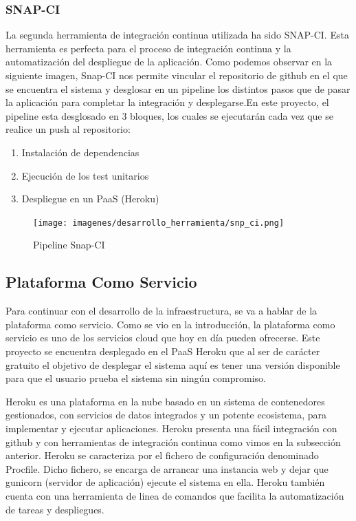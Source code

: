 \documentclass[a4paper,11pt]{book}
\begin{document}
\subsubsection{SNAP-CI}
La segunda herramienta de integración continua utilizada ha sido SNAP-CI\cite{snap}. Esta herramienta es perfecta para el proceso de integración continua y la automatización del despliegue de la aplicación. Como podemos observar en la siguiente imagen, Snap-CI nos permite vincular el repositorio de github en el que se encuentra el sistema y desglosar en un pipeline los distintos pasos que de pasar la aplicación para completar la integración y desplegarse.En este proyecto, el pipeline esta desglosado en 3 bloques, los cuales se ejecutarán cada vez que se realice un push al repositorio:

\begin{enumerate}
\item Instalación de dependencias
\item Ejecución de los test unitarios
\item Despliegue en un PaaS (Heroku)  
\end{enumerate}

\begin{figure}[H] 
\centering 
\texttt{[image: imagenes/desarrollo\_herramienta/snp\_ci.png]}
\caption{ Pipeline Snap-CI\cite{snapP}  }  
\end{figure}  	





\subsection{Plataforma Como Servicio}

Para continuar con el desarrollo de la infraestructura, se va a hablar de la plataforma como servicio. Como se vio en la introducción, la plataforma como servicio es uno de los servicios cloud que hoy en día pueden ofrecerse. Este proyecto se encuentra desplegado en el PaaS Heroku\cite{hero} que al ser de carácter gratuito el objetivo de desplegar el sistema aquí es tener una versión disponible para que el usuario prueba el sistema sin ningún compromiso.
 	
 

Heroku es una plataforma en la nube basado en un sistema de contenedores gestionados, con servicios de datos integrados y un potente ecosistema, para implementar y ejecutar aplicaciones. Heroku presenta una fácil integración con github y con herramientas de integración continua como vimos en la subsección anterior. Heroku se caracteriza por el fichero de configuración denominado Procfile. Dicho fichero, se encarga de arrancar una instancia web y dejar que gunicorn (servidor de aplicación) ejecute el sistema en ella. Heroku también cuenta con una herramienta de linea de comandos que facilita la automatización de tareas y despliegues. 
\end{document}
